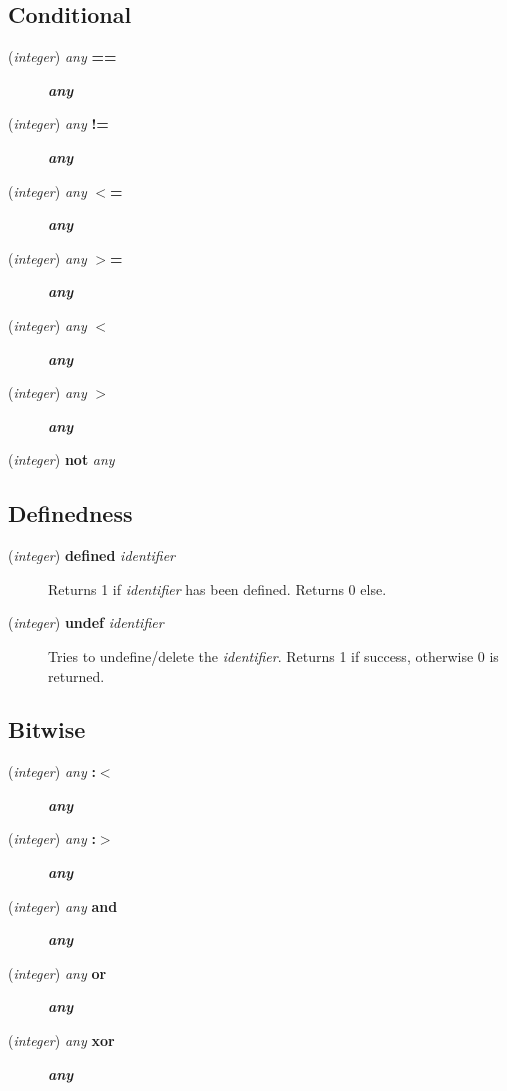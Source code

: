 \subsection*{Conditional\label{Conditional}}
\begin{description}

\item[{(\textit{integer}) \textit{any} \textbf{==}}] \textbf{\textit{any}}
\item[{(\textit{integer}) \textit{any} \textbf{!=}}] \textbf{\textit{any}}
\item[{(\textit{integer}) \textit{any} \textbf{$<$=}}] \textbf{\textit{any}}
\item[{(\textit{integer}) \textit{any} \textbf{$>$=}}] \textbf{\textit{any}}
\item[{(\textit{integer}) \textit{any} \textbf{$<$}}] \textbf{\textit{any}}
\item[{(\textit{integer}) \textit{any} \textbf{$>$}}] \textbf{\textit{any}}
\item[{(\textit{integer}) \textbf{not} \textit{any}}] \mbox{}\end{description}
\subsection*{Definedness\label{Definedness}}
\begin{description}

\item[{(\textit{integer}) \textbf{defined} \textit{identifier}}] \mbox{}

Returns 1 if \textit{identifier} has been defined. Returns 0 else.


\item[{(\textit{integer}) \textbf{undef} \textit{identifier}}] \mbox{}

Tries to undefine/delete the \textit{identifier}. Returns 1 if success, otherwise 0 is returned.

\end{description}
\subsection*{Bitwise\label{Bitwise}}
\begin{description}

\item[{(\textit{integer}) \textit{any} \textbf{:$<$}}] \textbf{\textit{any}}
\item[{(\textit{integer}) \textit{any} \textbf{:$>$}}] \textbf{\textit{any}}
\item[{(\textit{integer}) \textit{any} \textbf{and}}] \textbf{\textit{any}}
\item[{(\textit{integer}) \textit{any} \textbf{or}}] \textbf{\textit{any}}
\item[{(\textit{integer}) \textit{any} \textbf{xor}}] \textbf{\textit{any}}\end{description}
